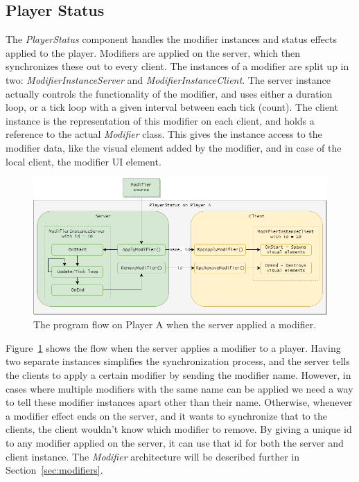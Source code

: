 \subsection{Player Status}
The \emph{PlayerStatus} component handles the modifier instances and status effects applied to the player. Modifiers are applied on the server, which then synchronizes these out to every client. The instances of a modifier are split up in two: \emph{ModifierInstanceServer} and \emph{ModifierInstanceClient}. The server instance actually controls the functionality of the modifier, and uses either a duration loop, or a tick loop with a given interval between each tick (count). The client instance is the representation of this modifier on each client, and holds a reference to the actual \emph{Modifier} class. This gives the instance access to the modifier data, like the visual element added by the modifier, and in case of the local client, the modifier UI element. 
 
\begin{figure}[tbph]
  \centering
  \includegraphics[width=\textwidth]{images/ApplyModifier}
  \caption[Program flow when applying a modifier]{The program flow on Player A when the server applied a modifier.}
  \label{fig:applyModifier}
\end{figure}
 
Figure~\ref{fig:applyModifier} shows the flow when the server applies a modifier to a player. Having two separate instances simplifies the synchronization process, and the server tells the clients to apply a certain modifier by sending the modifier name. However, in cases where multiple modifiers with the same name can be applied we need a way to tell these modifier instances apart other than their name. Otherwise, whenever a modifier effect ends on the server, and it wants to synchronize that to the clients, the client wouldn't know which modifier to remove. By giving a unique id to any modifier applied on the server, it can use that id for both the server and client instance. The
\emph{Modifier} architecture will be described further in Section~\ref{sec:modifiers}.

